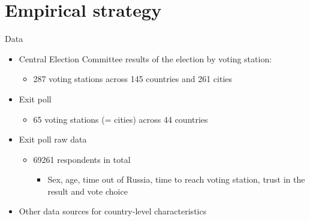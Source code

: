 \documentclass[xcolor=dvipsnames, 10pt]{beamer}
\begin{document}
	\section{Empirical strategy}

	\begin{frame}{Data}
	\begin{itemize}
		\item Central Election Committee results of the election by voting station:
		\begin{itemize}
			\item 287 voting stations across 145 countries and 261 cities
		\end{itemize}
		\item Exit poll
		\begin{itemize}
			\item 65 voting stations (= cities) across 44 countries
		\end{itemize}
		\item Exit poll raw data
		\begin{itemize}
			\item 69261 respondents in total
			\begin{itemize}
				\item Sex, age, time out of Russia, time to reach voting station, trust in the result and vote choice
			\end{itemize}	
		\end{itemize}
		\item Other data sources for country-level characteristics
	\end{itemize}
	\end{frame}
\end{document}
